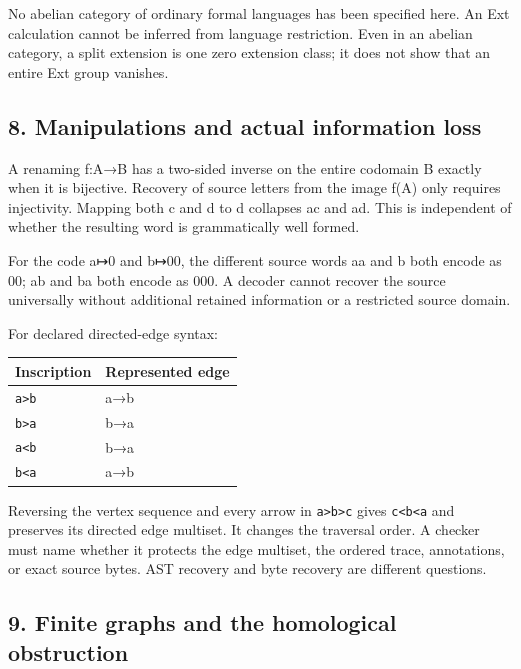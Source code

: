 \documentclass[
  11pt,
]{article}
\begin{document}
No abelian category of ordinary formal languages has been specified
here. An Ext calculation cannot be inferred from language restriction.
Even in an abelian category, a split extension is one zero extension
class; it does not show that an entire Ext group vanishes.

\subsection{8. Manipulations and actual information
loss}\label{manipulations-and-actual-information-loss}

A renaming f:A→B has a two-sided inverse on the entire codomain B
exactly when it is bijective. Recovery of source letters from the image
f(A) only requires injectivity. Mapping both c and d to d collapses ac
and ad. This is independent of whether the resulting word is
grammatically well formed.

For the code a↦0 and b↦00, the different source words aa and b both
encode as 00; ab and ba both encode as 000. A decoder cannot recover the
source universally without additional retained information or a
restricted source domain.

For declared directed-edge syntax:

\begin{longtable}[]{@{}ll@{}}
\toprule\noalign{}
Inscription & Represented edge \\
\midrule\noalign{}
\endhead
\bottomrule\noalign{}
\endlastfoot
\texttt{a\textgreater{}b} & a→b \\
\texttt{b\textgreater{}a} & b→a \\
\texttt{a\textless{}b} & b→a \\
\texttt{b\textless{}a} & a→b \\
\end{longtable}

Reversing the vertex sequence and every arrow in
\texttt{a\textgreater{}b\textgreater{}c} gives
\texttt{c\textless{}b\textless{}a} and preserves its directed edge
multiset. It changes the traversal order. A checker must name whether it
protects the edge multiset, the ordered trace, annotations, or exact
source bytes. AST recovery and byte recovery are different questions.

\subsection{9. Finite graphs and the homological
obstruction}\label{finite-graphs-and-the-homological-obstruction}
\end{document}
